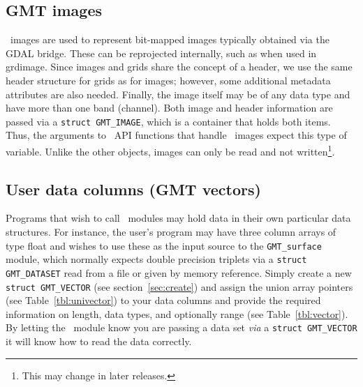 \documentclass[11pt]{report}
\begin{document}
\subsection{GMT images}

\GMT\ images are used to represent bit-mapped images typically obtained via the GDAL bridge.  These can be
reprojected internally, such as when used in grdimage.  Since images and grids share the concept
of a header, we use the same header structure for grids as for images; however, some additional
metadata attributes are also needed.  Finally, the image itself may be of any data type and have more than one band (channel).
Both image and header information are passed via a \texttt{struct GMT\_IMAGE}, which is a container that holds both items.
Thus, the arguments to \GMT\ API functions that handle \GMT\ images expect this type
of variable.  Unlike the other objects, images can only be read and not written\footnote{This may change in later releases.}.

\subsection{User data columns (GMT vectors)}

Programs that wish to call \GMT\ modules may hold data in their own particular data
structures.  For instance, the user's program may have three column arrays of type float
and wishes to use these as the input source to the \texttt{GMT\_surface} module, which normally
expects double precision triplets via a \texttt{struct GMT\_DATASET} read from a file or given by memory reference.
Simply create a new \texttt{struct GMT\_VECTOR} (see section~\ref{sec:create}) and assign the union
array pointers (see Table~\ref{tbl:univector}) to your data columns and provide
the required information on length, data types, and optionally range (see Table~\ref{tbl:vector}).
By letting the \GMT\ module know you are passing a data set \emph{via} a \texttt{struct GMT\_VECTOR} it
will know how to read the data correctly.
\end{document}
